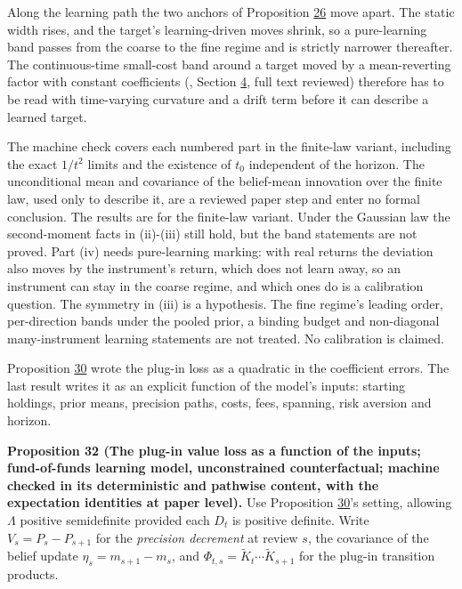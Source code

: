 \documentclass[11pt]{article}
\begin{document}
Along the learning path the two anchors of Proposition \hyperref[res:Proposition-26]{26} move apart.
The static width rises, and the target's learning-driven moves shrink,
so a pure-learning band passes from the coarse to the fine regime and
is strictly narrower thereafter. The continuous-time small-cost band
around a target moved by a mean-reverting factor with constant
coefficients (\cite{muhlekarbe2017primer}, Section \hyperref[sec:4]{4}, full text reviewed)
therefore has to be read with time-varying curvature and a drift term
before it can describe a learned target.

The machine check covers each numbered part in the finite-law
variant, including the exact \(1/t^2\) limits and the existence of
\(t_0\) independent of the horizon. The unconditional mean and
covariance of the belief-mean innovation over the finite law, used
only to describe it, are a reviewed paper step and enter no formal
conclusion. The results are for the finite-law variant. Under the
Gaussian law the second-moment facts in (ii)-(iii) still hold, but the
band statements are not proved. Part (iv) needs pure-learning
marking: with real returns the deviation also moves by the
instrument's return, which does not learn away, so an instrument can
stay in the coarse regime, and which ones do is a calibration
question. The symmetry in (iii) is a hypothesis. The fine regime's
leading order, per-direction bands under the pooled prior, a binding
budget and non-diagonal many-instrument learning statements are not
treated. No calibration is claimed.

Proposition \hyperref[res:Proposition-30]{30} wrote the plug-in loss as a quadratic in the
coefficient errors. The last result writes it as an explicit function
of the model's inputs: starting holdings, prior means, precision
paths, costs, fees, spanning, risk aversion and horizon.

\label{res:Proposition-32}
\textbf{Proposition 32 (The plug-in value loss as a function of the inputs; fund-of-funds learning model, unconstrained counterfactual; machine checked in its deterministic and pathwise content, with the expectation identities at paper level).}
Use Proposition \hyperref[res:Proposition-30]{30}'s setting, allowing \(\Lambda\) positive semidefinite
provided each \(D_t\) is positive definite. Write \(V_s=P_s-P_{s+1}\) for the
\emph{precision decrement} at review \(s\), the covariance of the belief
update \(\eta_s=m_{s+1}-m_s\), and \(\Phi_{t,s}=\tilde K_t\cdots\tilde K_{s+1}\) for the
plug-in transition products.
\end{document}

